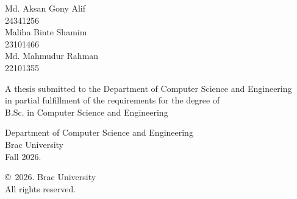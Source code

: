 \begin{titlepage}
\renewcommand*{\thepage}{Title} %

    \begin{center} 
        \vspace*{3cm} %
        
        {\fontsize{16pt}{22pt}\selectfont{Confidence-Aware Episodic Memory with Self-Improvement for Hallucination Reduction in Large Language Models}
        } %
        
        \vspace{1.5cm}
        
        
        \vspace{0.5cm}
        
        	Md. Aksan Gony Alif\\
	        24341256\\
            Maliha Binte Shamim\\
	        23101466\\
	        Md. Mahmudur Rahman\\
	        22101355


        \vspace{1.5cm}
        
        	A thesis submitted to the Department of Computer Science and Engineering\\
            in partial fulfillment of the requirements for the degree of\\
            B.Sc. in Computer Science and Engineering

        
        \vspace{2.5cm}
        
    		Department of Computer Science and Engineering\\
            Brac University\\
            Fall 2026.
        
        \vspace{3cm}
        
    		\copyright\ 2026. Brac University\\
            All rights reserved.
    
    \end{center}

\end{titlepage}